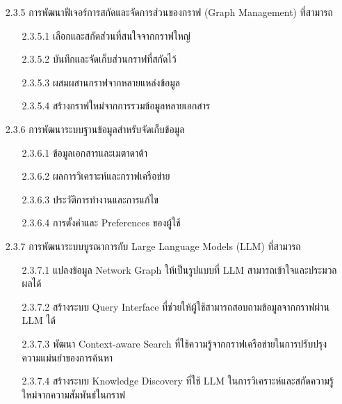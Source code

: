 \documentclass[12pt,a4paper]{article}
\begin{document}
\begin{enumerate}[leftmargin=2cm]
{\begin{enumerate}
\begin{enumerate}
            \end{enumerate}
            \item[2.3.5] การพัฒนาฟีเจอร์การสกัดและจัดการส่วนของกราฟ (Graph Management) ที่สามารถ
            \begin{enumerate}
                \item[2.3.5.1] เลือกและสกัดส่วนที่สนใจจากกราฟใหญ่
                \item[2.3.5.2] บันทึกและจัดเก็บส่วนกราฟที่สกัดไว้
                \item[2.3.5.3] ผสมผสานกราฟจากหลายแหล่งข้อมูล
                \item[2.3.5.4] สร้างกราฟใหม่จากการรวมข้อมูลหลายเอกสาร
            \end{enumerate}
            \item[2.3.6] การพัฒนาระบบฐานข้อมูลสำหรับจัดเก็บข้อมูล
            \begin{enumerate}
                \item[2.3.6.1] ข้อมูลเอกสารและเมตาดาต้า
                \item[2.3.6.2] ผลการวิเคราะห์และกราฟเครือข่าย
                \item[2.3.6.3] ประวัติการทำงานและการแก้ไข
                \item[2.3.6.4] การตั้งค่าและ Preferences ของผู้ใช้
            \end{enumerate}
            \item[2.3.7] การพัฒนาระบบบูรณาการกับ Large Language Models (LLM) ที่สามารถ
            \begin{enumerate}
                \item[2.3.7.1] แปลงข้อมูล Network Graph ให้เป็นรูปแบบที่ LLM สามารถเข้าใจและประมวลผลได้
                \item[2.3.7.2] สร้างระบบ Query Interface ที่ช่วยให้ผู้ใช้สามารถสอบถามข้อมูลจากกราฟผ่าน LLM ได้
                \item[2.3.7.3] พัฒนา Context-aware Search ที่ใช้ความรู้จากกราฟเครือข่ายในการปรับปรุงความแม่นยำของการค้นหา
                \item[2.3.7.4] สร้างระบบ Knowledge Discovery ที่ใช้ LLM ในการวิเคราะห์และสกัดความรู้ใหม่จากความสัมพันธ์ในกราฟ
            \end{enumerate}
        \end{enumerate}
    }


\end{enumerate}
\end{document}
